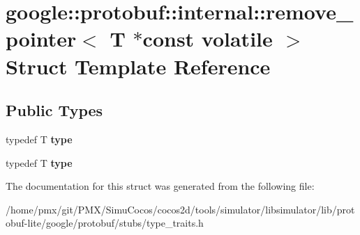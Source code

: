 \hypertarget{structgoogle_1_1protobuf_1_1internal_1_1remove__pointer_3_01T_01_5const_01volatile_01_4}{}\section{google\+:\+:protobuf\+:\+:internal\+:\+:remove\+\_\+pointer$<$ T $\ast$const volatile $>$ Struct Template Reference}
\label{structgoogle_1_1protobuf_1_1internal_1_1remove__pointer_3_01T_01_5const_01volatile_01_4}
\subsection*{Public Types}
\begin{DoxyCompactItemize}
\item 
\mbox{\label{structgoogle_1_1protobuf_1_1internal_1_1remove__pointer_3_01T_01_5const_01volatile_01_4_a36093eaa1a8f72592855a3d308482921}} 
typedef T {\bfseries type}
\item 
\mbox{\label{structgoogle_1_1protobuf_1_1internal_1_1remove__pointer_3_01T_01_5const_01volatile_01_4_a36093eaa1a8f72592855a3d308482921}} 
typedef T {\bfseries type}
\end{DoxyCompactItemize}


The documentation for this struct was generated from the following file\+:\begin{DoxyCompactItemize}
\item 
/home/pmx/git/\+P\+M\+X/\+Simu\+Cocos/cocos2d/tools/simulator/libsimulator/lib/protobuf-\/lite/google/protobuf/stubs/type\+\_\+traits.\+h\end{DoxyCompactItemize}
